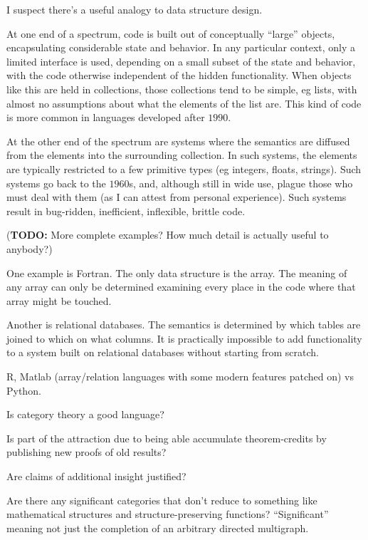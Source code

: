 \documentclass[11pt,openany]{book}
\begin{document}
I suspect there's a useful analogy to data structure design.

At one end of a spectrum, code is built out of conceptually 
``large'' objects, encapsulating considerable state and
behavior. In any particular context, only a limited interface
is used, depending on a small subset of the state and behavior,
with the code otherwise independent of the hidden functionality.
When objects like this are held in collections, those collections
tend to be simple, eg lists, with almost no assumptions
about what the elements of the list are.
This kind of code is more common in languages developed 
after $1990$.

At the other end of the spectrum are systems where the semantics
are diffused from the elements into the surrounding collection.
In such systems, the elements are typically restricted 
to a few primitive types (eg integers, floats, strings).
Such systems go back to the $1960$s, 
and, although still in wide use,
plague those who must deal with them (as I can attest from personal
experience).
Such systems result in bug-ridden, inefficient, 
inflexible, brittle code.

(\textbf{TODO:} More complete examples? 
How much detail is actually useful to anybody?)

One example is Fortran. The only data structure is the array.
The meaning of any array can only be determined examining every
place in the code where that array might be touched.

Another is relational databases. The semantics is determined
by which tables are joined to which on what columns.
It is practically impossible to add functionality to a system
built on relational databases without starting from scratch.

R, Matlab (array/relation languages with some modern features
patched on) vs Python.

\label{sec:Right-abstraction}

Is category theory a good language?~\cite{wiki:AbstractNonsense}

Is part of the attraction due to being able accumulate
theorem-credits by publishing
new proofs of old results?

Are claims of additional insight justified?

Are there any significant categories 
that don't reduce to something like mathematical structures
and structure-preserving functions?
``Significant'' meaning not just the completion of an arbitrary
directed multigraph.
\end{document}

